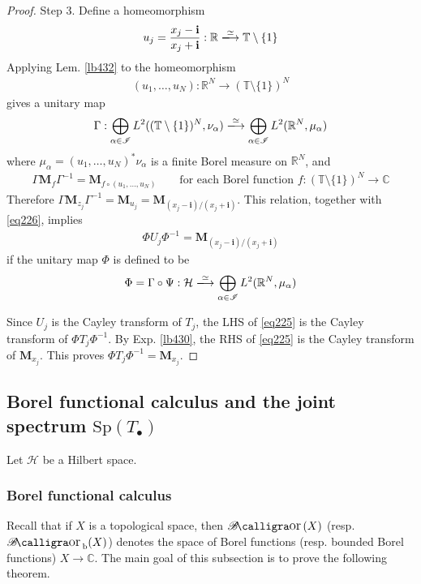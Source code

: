 \documentclass[12pt,b5paper,notitlepage]{article}
\theoremstyle{definition}
\theoremstyle{plain}
\DeclareMathOperator{\Bor}{\mathscr{B}\text{\kern -2pt {\calligra\large or}}\,}
\DeclareMathOperator{\Borb}{{\mathscr{B}\text{\kern -2pt {\calligra\large or}}\,}_{\mathrm b}}
\newcommand{\im}{\mathbf{i}}
\newcommand{\blt}{\bullet}
\newcommand{\Cbb}{\mathbb C}
\newcommand{\Rbb}{\mathbb R}
\newcommand{\Tbb}{\mathbb T}
\newcommand{\Sp}{\mathrm{Sp}}
\newcommand{\MH}{\mathcal H}
\newcommand{\SI}{\mathscr I}
\newcommand{\Mbf}{\mathbf M}
\numberwithin{equation}{section}
\begin{document}
\begin{proof}
Step 3. Define a homeomorphism
\begin{align*}
u_j=\frac{x_j-\im}{x_j+\im}:\Rbb\xlongrightarrow{\simeq}\Tbb\setminus\{1\}
\end{align*}
Applying Lem. \ref{lb432} to the homeomorphism
\begin{align*}
(u_1,\dots,u_N):\Rbb^N\rightarrow (\Tbb\setminus\{1\})^N
\end{align*}
gives a unitary map
\begin{align*}
\Gamma:\bigoplus_{\alpha\in\SI}L^2((\Tbb\setminus\{1\})^N,\nu_\alpha)\xlongrightarrow{\simeq}\bigoplus_{\alpha\in\SI}L^2(\Rbb^N,\mu_\alpha)
\end{align*}
where $\mu_\alpha=(u_1,\dots,u_N)^*\nu_\alpha$ is a finite Borel measure on $\Rbb^N$, and
\begin{align*}
\Gamma\Mbf_f \Gamma^{-1}=\Mbf_{f\circ(u_1,\dots,u_N)}\qquad\text{for each Borel function }f:(\Tbb\setminus\{1\})^N\rightarrow\Cbb
\end{align*}
Therefore $\Gamma\Mbf_{z_j}\Gamma^{-1}=\Mbf_{u_j}=\Mbf_{(x_j-\im)/(x_j+\im)}$. This relation, together with \eqref{eq226}, implies
\begin{align}\label{eq225}
\Phi U_j\Phi^{-1}=\Mbf_{(x_j-\im)/(x_j+\im)}
\end{align}
if the unitary map $\Phi$ is defined to be
\begin{align*}
\Phi=\Gamma\circ\Psi:\MH\xlongrightarrow{\simeq}\bigoplus_{\alpha\in\SI}L^2(\Rbb^N,\mu_\alpha)
\end{align*}

Since $U_j$ is the Cayley transform of $T_j$, the LHS of \eqref{eq225} is the Cayley transform of $\Phi T_j\Phi^{-1}$. By Exp. \ref{lb430}, the RHS of \eqref{eq225} is the Cayley transform of $\Mbf_{x_j}$. This proves $\Phi T_j\Phi^{-1}=\Mbf_{x_j}$.
\end{proof}


\subsection{Borel functional calculus and the joint spectrum $\Sp(T_\blt)$}

Let $\MH$ be a Hilbert space.


\subsubsection{Borel functional calculus}


Recall that if $X$ is a topological space, then $\Bor(X)$ (resp. $\Borb(X)$) denotes the space of Borel functions (resp. bounded Borel functions) $X\rightarrow\Cbb$. The main goal of this subsection is to prove the following theorem.
\end{document}
